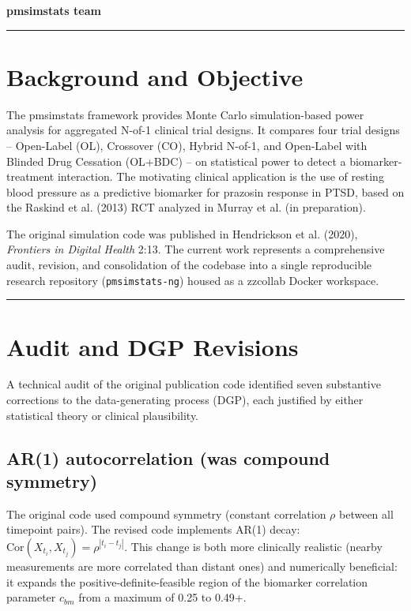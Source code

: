 \documentclass[11pt]{article}
\begin{document}
\maketitle
\thispagestyle{fancy}
\tableofcontents

\textbf{pmsimstats team}

\bigskip\noindent\rule{\textwidth}{0.4pt}\bigskip

\section{Background and Objective}

The pmsimstats framework provides Monte Carlo simulation-based
power analysis for aggregated N-of-1 clinical trial designs. It
compares four trial designs -- Open-Label (OL), Crossover (CO),
Hybrid N-of-1, and Open-Label with Blinded Drug Cessation
(OL+BDC) -- on statistical power to detect a biomarker-treatment
interaction. The motivating clinical application is the use of
resting blood pressure as a predictive biomarker for prazosin
response in PTSD, based on the Raskind et al. (2013) RCT analyzed
in Murray et al. (in preparation).

The original simulation code was published in Hendrickson et al.
(2020), \textit{Frontiers in Digital Health} 2:13. The current work
represents a comprehensive audit, revision, and consolidation of
the codebase into a single reproducible research repository
(\texttt{pmsimstats-ng}) housed as a zzcollab Docker workspace.

\bigskip\noindent\rule{\textwidth}{0.4pt}\bigskip

\section{Audit and DGP Revisions}

A technical audit of the original publication code identified
seven substantive corrections to the data-generating process
(DGP), each justified by either statistical theory or clinical
plausibility.

\subsection{AR(1) autocorrelation (was compound symmetry)}

The original code used compound symmetry (constant correlation
$\rho$ between all timepoint pairs). The revised code implements
AR(1) decay: $\text{Cor}(X_{t_i}, X_{t_j}) = \rho^{|t_i - t_j|}$.
This change is both more clinically realistic (nearby measurements
are more correlated than distant ones) and numerically beneficial:
it expands the positive-definite-feasible region of the biomarker
correlation parameter $c_{bm}$ from a maximum of 0.25 to 0.49+.
\end{document}
